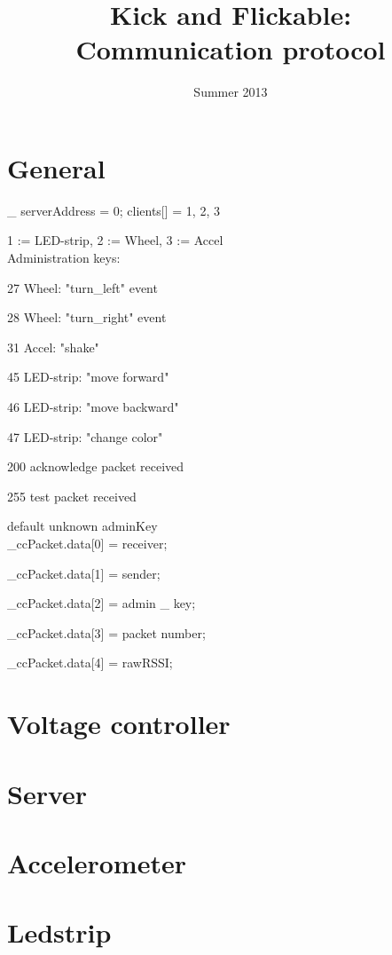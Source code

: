 \documentclass[11pt]{article}
\begin{document}
\author{}
\title{Kick and Flickable: Communication protocol}
\date{Summer 2013}
\maketitle

\tableofcontents
\newpage

\section{General}
\_ serverAddress = 0;
clients[] = {1, 2, 3}

1 := LED-strip, 2 := Wheel, 3 := Accel
\\

Administration keys:

27 Wheel: "turn\_left" event

28 Wheel: "turn\_right" event

31 Accel: "shake"

45 LED-strip: "move forward"

46 LED-strip: "move backward"

47 LED-strip: "change color"

200 acknowledge packet received

255 test packet received

default unknown adminKey
\\

\_ccPacket.data[0] = receiver;

\_ccPacket.data[1] = sender;
 
\_ccPacket.data[2] = admin \_ key;

\_ccPacket.data[3] = packet number; %

\_ccPacket.data[4] = rawRSSI;

\section{Voltage controller}




\section{Server}


\section{Accelerometer}

\section{Ledstrip} 
\end{document}
